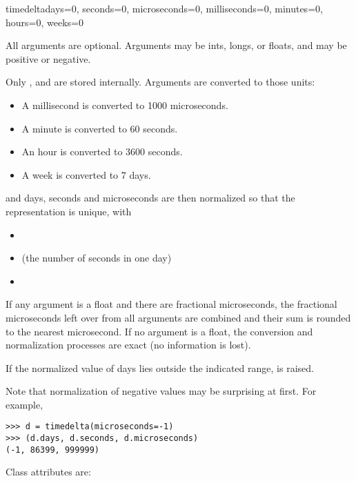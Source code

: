 \begin{classdesc}{timedelta}{days=0, seconds=0, microseconds=0,
                             milliseconds=0, minutes=0, hours=0, weeks=0}

  All arguments are optional.  Arguments may be ints, longs, or floats,
  and may be positive or negative.

  Only ,  and  are stored
  internally.  Arguments are converted to those units:

\begin{itemize}
  \item A millisecond is converted to 1000 microseconds.
  \item A minute is converted to 60 seconds.
  \item An hour is converted to 3600 seconds.
  \item A week is converted to 7 days.
\end{itemize}

  and days, seconds and microseconds are then normalized so that the
  representation is unique, with

\begin{itemize}
  \item {}
  \item {} (the number of seconds in one day)
  \item {}
\end{itemize}

  If any argument is a float and there are fractional microseconds,
  the fractional microseconds left over from all arguments are combined
  and their sum is rounded to the nearest microsecond.  If no
  argument is a float, the conversion and normalization processes
  are exact (no information is lost).

  If the normalized value of days lies outside the indicated range,
   is raised.

  Note that normalization of negative values may be surprising at first.
  For example,

\begin{verbatim}
>>> d = timedelta(microseconds=-1)
>>> (d.days, d.seconds, d.microseconds)
(-1, 86399, 999999)
\end{verbatim}
\end{classdesc}

Class attributes are:

